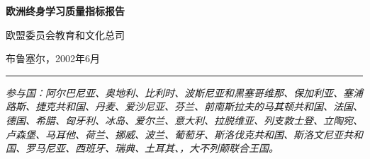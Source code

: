 \documentclass[oneside, UTF8]{ctexbook}
\begin{document}
\begin{titlepage}
  \begin{center}
    \quad

    \vspace{.2\textheight}
    \Huge\textbf{欧洲终身学习质量指标报告}

    \vspace{2ex}
    \normalsize 欧盟委员会教育和文化总司

    \vfill
    布鲁塞尔，2002年6月
  \end{center}

  \hrule
  \vspace{1ex}
  \noindent\itshape 参与国：阿尔巴尼亚、奥地利、比利时、波斯尼亚和黑塞哥维那、保加利亚、塞浦路斯、捷克共和国、丹麦、爱沙尼亚、芬兰、前南斯拉夫的马其顿共和国、法国、德国、希腊、匈牙利、冰岛、爱尔兰、意大利、拉脱维亚、列支敦士登、立陶宛、卢森堡、马耳他、荷兰、挪威、波兰、葡萄牙、斯洛伐克共和国、斯洛文尼亚共和国、罗马尼亚、西班牙、瑞典、土耳其、，大不列颠联合王国。
  
\end{titlepage}


\tableofcontents%


\mainmatter
\end{document}
